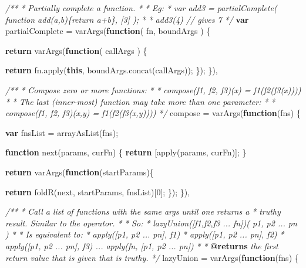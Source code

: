 \documentclass[]{article}
\newenvironment{Shaded}{}{}
\newcommand{\KeywordTok}[1]{\textcolor[rgb]{0.00,0.44,0.13}{\textbf{{#1}}}}
\newcommand{\DecValTok}[1]{\textcolor[rgb]{0.25,0.63,0.44}{{#1}}}
\newcommand{\CommentTok}[1]{\textcolor[rgb]{0.38,0.63,0.69}{\textit{{#1}}}}
\newcommand{\OtherTok}[1]{\textcolor[rgb]{0.00,0.44,0.13}{{#1}}}
\newcommand{\FunctionTok}[1]{\textcolor[rgb]{0.02,0.16,0.49}{{#1}}}
\newcommand{\NormalTok}[1]{{#1}}
\begin{document}
\begin{Shaded}
\begin{Highlighting}[]
\CommentTok{/** }
\CommentTok{ * Partially complete a function.}
\CommentTok{ * }
\CommentTok{ * Eg: }
\CommentTok{ *    var add3 = partialComplete( function add(a,b)\{return a+b\}, [3] );}
\CommentTok{ *    }
\CommentTok{ *    add3(4) // gives 7}
\CommentTok{ */}
\KeywordTok{var} \NormalTok{partialComplete = }\FunctionTok{varArgs}\NormalTok{(}\KeywordTok{function}\NormalTok{( fn, boundArgs ) \{}

      \KeywordTok{return} \FunctionTok{varArgs}\NormalTok{(}\KeywordTok{function}\NormalTok{( callArgs ) \{}
               
         \KeywordTok{return} \OtherTok{fn}\NormalTok{.}\FunctionTok{apply}\NormalTok{(}\KeywordTok{this}\NormalTok{, }\OtherTok{boundArgs}\NormalTok{.}\FunctionTok{concat}\NormalTok{(callArgs));}
      \NormalTok{\}); }
   \NormalTok{\}),}


\CommentTok{/**}
\CommentTok{ * Compose zero or more functions:}
\CommentTok{ * }
\CommentTok{ *    compose(f1, f2, f3)(x) = f1(f2(f3(x))))}
\CommentTok{ * }
\CommentTok{ * The last (inner-most) function may take more than one parameter:}
\CommentTok{ * }
\CommentTok{ *    compose(f1, f2, f3)(x,y) = f1(f2(f3(x,y))))}
\CommentTok{ */}
   \NormalTok{compose = }\FunctionTok{varArgs}\NormalTok{(}\KeywordTok{function}\NormalTok{(fns) \{}

      \KeywordTok{var} \NormalTok{fnsList = }\FunctionTok{arrayAsList}\NormalTok{(fns);}
   
      \KeywordTok{function} \FunctionTok{next}\NormalTok{(params, curFn) \{  }
         \KeywordTok{return} \NormalTok{[}\FunctionTok{apply}\NormalTok{(params, curFn)];   }
      \NormalTok{\}}
      
      \KeywordTok{return} \FunctionTok{varArgs}\NormalTok{(}\KeywordTok{function}\NormalTok{(startParams)\{}
        
         \KeywordTok{return} \FunctionTok{foldR}\NormalTok{(next, startParams, fnsList)[}\DecValTok{0}\NormalTok{];}
      \NormalTok{\});}
   \NormalTok{\}),}

\CommentTok{/**}
\CommentTok{ * Call a list of functions with the same args until one returns a }
\CommentTok{ * truthy result. Similar to the \textbar{}\textbar{} operator.}
\CommentTok{ * }
\CommentTok{ * So:}
\CommentTok{ *      lazyUnion([f1,f2,f3 ... fn])( p1, p2 ... pn )}
\CommentTok{ *      }
\CommentTok{ * Is equivalent to: }
\CommentTok{ *      apply([p1, p2 ... pn], f1) \textbar{}\textbar{} }
\CommentTok{ *      apply([p1, p2 ... pn], f2) \textbar{}\textbar{} }
\CommentTok{ *      apply([p1, p2 ... pn], f3) ... apply(fn, [p1, p2 ... pn])  }
\CommentTok{ *  }
\CommentTok{ * }\KeywordTok{@returns}\CommentTok{ the first return value that is given that is truthy.}
\CommentTok{ */}
   \NormalTok{lazyUnion = }\FunctionTok{varArgs}\NormalTok{(}\KeywordTok{function}\NormalTok{(fns) \{}


\end{Highlighting}
\end{Shaded}
\end{document}
